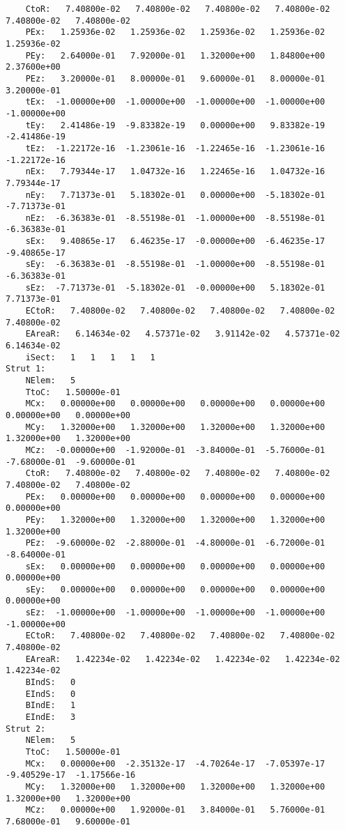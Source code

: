 \begin{lstlisting}
    CtoR:   7.40800e-02   7.40800e-02   7.40800e-02   7.40800e-02   7.40800e-02   7.40800e-02
    PEx:   1.25936e-02   1.25936e-02   1.25936e-02   1.25936e-02   1.25936e-02
    PEy:   2.64000e-01   7.92000e-01   1.32000e+00   1.84800e+00   2.37600e+00
    PEz:   3.20000e-01   8.00000e-01   9.60000e-01   8.00000e-01   3.20000e-01
    tEx:  -1.00000e+00  -1.00000e+00  -1.00000e+00  -1.00000e+00  -1.00000e+00
    tEy:   2.41486e-19  -9.83382e-19   0.00000e+00   9.83382e-19  -2.41486e-19
    tEz:  -1.22172e-16  -1.23061e-16  -1.22465e-16  -1.23061e-16  -1.22172e-16
    nEx:   7.79344e-17   1.04732e-16   1.22465e-16   1.04732e-16   7.79344e-17
    nEy:   7.71373e-01   5.18302e-01   0.00000e+00  -5.18302e-01  -7.71373e-01
    nEz:  -6.36383e-01  -8.55198e-01  -1.00000e+00  -8.55198e-01  -6.36383e-01
    sEx:   9.40865e-17   6.46235e-17  -0.00000e+00  -6.46235e-17  -9.40865e-17
    sEy:  -6.36383e-01  -8.55198e-01  -1.00000e+00  -8.55198e-01  -6.36383e-01
    sEz:  -7.71373e-01  -5.18302e-01  -0.00000e+00   5.18302e-01   7.71373e-01
    ECtoR:   7.40800e-02   7.40800e-02   7.40800e-02   7.40800e-02   7.40800e-02
    EAreaR:   6.14634e-02   4.57371e-02   3.91142e-02   4.57371e-02   6.14634e-02
    iSect:   1   1   1   1   1
Strut 1:
    NElem:   5
    TtoC:   1.50000e-01
    MCx:   0.00000e+00   0.00000e+00   0.00000e+00   0.00000e+00   0.00000e+00   0.00000e+00
    MCy:   1.32000e+00   1.32000e+00   1.32000e+00   1.32000e+00   1.32000e+00   1.32000e+00
    MCz:  -0.00000e+00  -1.92000e-01  -3.84000e-01  -5.76000e-01  -7.68000e-01  -9.60000e-01
    CtoR:   7.40800e-02   7.40800e-02   7.40800e-02   7.40800e-02   7.40800e-02   7.40800e-02
    PEx:   0.00000e+00   0.00000e+00   0.00000e+00   0.00000e+00   0.00000e+00
    PEy:   1.32000e+00   1.32000e+00   1.32000e+00   1.32000e+00   1.32000e+00
    PEz:  -9.60000e-02  -2.88000e-01  -4.80000e-01  -6.72000e-01  -8.64000e-01
    sEx:   0.00000e+00   0.00000e+00   0.00000e+00   0.00000e+00   0.00000e+00
    sEy:   0.00000e+00   0.00000e+00   0.00000e+00   0.00000e+00   0.00000e+00
    sEz:  -1.00000e+00  -1.00000e+00  -1.00000e+00  -1.00000e+00  -1.00000e+00
    ECtoR:   7.40800e-02   7.40800e-02   7.40800e-02   7.40800e-02   7.40800e-02
    EAreaR:   1.42234e-02   1.42234e-02   1.42234e-02   1.42234e-02   1.42234e-02
    BIndS:   0
    EIndS:   0
    BIndE:   1
    EIndE:   3
Strut 2:
    NElem:   5
    TtoC:   1.50000e-01
    MCx:   0.00000e+00  -2.35132e-17  -4.70264e-17  -7.05397e-17  -9.40529e-17  -1.17566e-16
    MCy:   1.32000e+00   1.32000e+00   1.32000e+00   1.32000e+00   1.32000e+00   1.32000e+00
    MCz:   0.00000e+00   1.92000e-01   3.84000e-01   5.76000e-01   7.68000e-01   9.60000e-01

\end{lstlisting}
